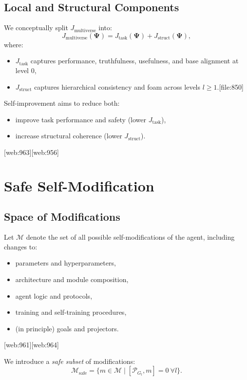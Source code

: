 \documentclass[12pt]{article}
\begin{document}
\subsection{Local and Structural Components}

We conceptually split $J_{\text{multiverse}}$ into:
\[
J_{\text{multiverse}}(\bm{\Psi}) =
J_{\text{task}}(\bm{\Psi})
+
J_{\text{struct}}(\bm{\Psi}),
\]
where:
\begin{itemize}
  \item $J_{\text{task}}$ captures performance, truthfulness, usefulness,
        and base alignment at level 0,
  \item $J_{\text{struct}}$ captures hierarchical consistency and foam
        across levels $l \ge 1$.[file:850]
\end{itemize}

Self-improvement aims to reduce both:
\begin{itemize}
  \item improve task performance and safety (lower $J_{\text{task}}$),
  \item increase structural coherence (lower $J_{\text{struct}}$).
\end{itemize}[web:963][web:956]

\section{Safe Self-Modification}

\subsection{Space of Modifications}

Let $\mathcal{M}$ denote the set of all possible self-modifications of
the agent, including changes to:
\begin{itemize}
  \item parameters and hyperparameters,
  \item architecture and module composition,
  \item agent logic and protocols,
  \item training and self-training procedures,
  \item (in principle) goals and projectors.
\end{itemize}[web:961][web:964]

We introduce a \emph{safe subset} of modifications:
\[
\mathcal{M}_{\text{safe}} =
\{ m \in \mathcal{M}
   \mid
   [\mathcal{P}_{G_l}, m] = 0 \ \forall l
\}.
\]
\end{document}
